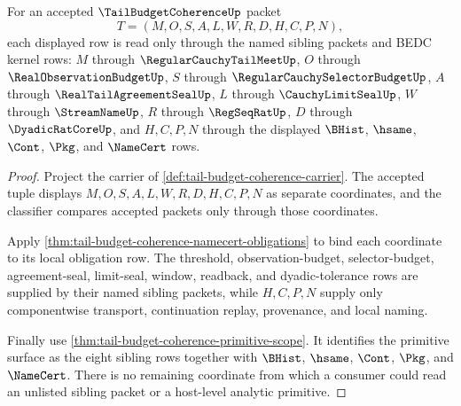 \begin{theorem}
\label{thm:tail-budget-coherence-sibling-scope-lock}
For an accepted $\TailBudgetCoherenceUp$ packet
$$
T=(M,O,S,A,L,W,R,D,H,C,P,N),
$$
each displayed row is read only through the named sibling packets and BEDC kernel rows: $M$ through $\RegularCauchyTailMeetUp$, $O$ through $\RealObservationBudgetUp$, $S$ through $\RegularCauchySelectorBudgetUp$, $A$ through $\RealTailAgreementSealUp$, $L$ through $\CauchyLimitSealUp$, $W$ through $\StreamNameUp$, $R$ through $\RegSeqRatUp$, $D$ through $\DyadicRatCoreUp$, and $H,C,P,N$ through the displayed $\BHist$, $\hsame$, $\Cont$, $\Pkg$, and $\NameCert$ rows.
\end{theorem}
\begin{proof}
Project the carrier of \autoref{def:tail-budget-coherence-carrier}. The accepted tuple displays $M,O,S,A,L,W,R,D,H,C,P,N$ as separate coordinates, and the classifier compares accepted packets only through those coordinates.

Apply \autoref{thm:tail-budget-coherence-namecert-obligations} to bind each coordinate to its local obligation row. The threshold, observation-budget, selector-budget, agreement-seal, limit-seal, window, readback, and dyadic-tolerance rows are supplied by their named sibling packets, while $H,C,P,N$ supply only componentwise transport, continuation replay, provenance, and local naming.

Finally use \autoref{thm:tail-budget-coherence-primitive-scope}. It identifies the primitive surface as the eight sibling rows together with $\BHist$, $\hsame$, $\Cont$, $\Pkg$, and $\NameCert$. There is no remaining coordinate from which a consumer could read an unlisted sibling packet or a host-level analytic primitive.
\end{proof}

